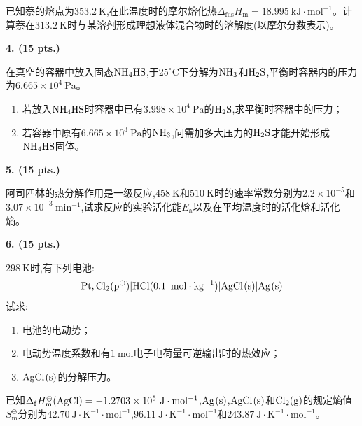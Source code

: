 已知萘的熔点为$353.2\ \mathrm{K}$,在此温度时的摩尔熔化热$\Delta_\mathrm{fus}H_\mathrm{m}=18.995\ \mathrm{kJ\cdot mol^{-1}}$。计算萘在$313.2\ \mathrm{K}$时与某溶剂形成理想液体混合物时的溶解度(以摩尔分数表示)。

\vspace{0.5cm}
\noindent\textbf{4. (15 pts.)}

在真空的容器中放入固态$\ce{NH_{4}HS}$,于$25^\circ\mathrm{C}$下分解为$\ce{NH_{3}}$和$\ce{H_{2}S}$,平衡时容器内的压力为$6.665\times10^4\ \mathrm{Pa}$。
\begin{enumerate}[label=(\arabic*), itemsep=1ex]
    \item 若放入$\ce{NH_{4}HS}$时容器中已有$3.998\times10^4\ \mathrm{Pa}$的$\ce{H_{2}S}$,求平衡时容器中的压力；
    \item 若容器中原有$6.665\times10^3\ \mathrm{Pa}$的$\ce{NH_{3}}$,问需加多大压力的$\ce{H_{2}S}$才能开始形成$\ce{NH_{4}HS}$固体。
\end{enumerate}

\vspace{0.5cm}
\noindent\textbf{5. (15 pts.)}

阿司匹林的热分解作用是一级反应,$458\ \mathrm{K}$和$510\ \mathrm{K}$时的速率常数分别为$2.2\times10^{-5}$和$3.07\times10^{-3}\ \mathrm{min^{-1}}$,试求反应的实验活化能$E_\mathrm{a}$以及在平均温度时的活化焓和活化熵。

\vspace{0.5cm}
\noindent\textbf{6. (15 pts.)}

$298\ \mathrm{K}$时,有下列电池:
\[
\ce{Pt,Cl_{2}(p^\ominus)}|\ce{HCl(0.1\ mol\cdot kg^{-1})}|\ce{AgCl(s)}|\ce{Ag(s)}
\]
试求:
\begin{enumerate}[label=(\arabic*), itemsep=1ex]
    \item 电池的电动势；
    \item 电动势温度系数和有$1\ \mathrm{mol}$电子电荷量可逆输出时的热效应；
    \item $\ce{AgCl(s)}$的分解压力。
\end{enumerate}
已知$\Delta_\mathrm{f}H_\mathrm{m}^\ominus(\ce{AgCl})=-1.2703\times10^5\ \mathrm{J\cdot mol^{-1}}$,$\ce{Ag(s)}$,$\ce{AgCl(s)}$和$\ce{Cl_{2}(g)}$的规定熵值$S_\mathrm{m}^\ominus$分别为$42.70\ \mathrm{J\cdot K^{-1}\cdot mol^{-1}}$,$96.11\ \mathrm{J\cdot K^{-1}\cdot mol^{-1}}$和$243.87\ \mathrm{J\cdot K^{-1}\cdot mol^{-1}}$。

